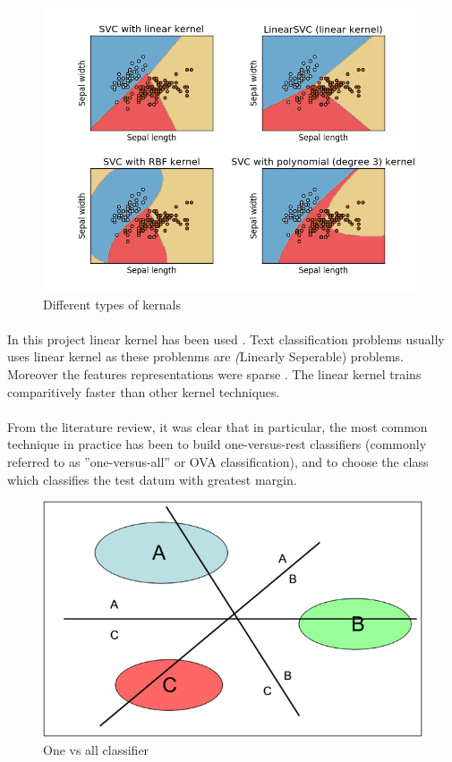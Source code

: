  \begin{figure}[!ht]
	\centering
	\includegraphics[width=0.9\linewidth]{svm_kernal.png}
	\caption{Different types of kernals}
	\label{fig:expression01}
\end{figure}

\paragraph{}
 In this project linear kernel has been used . Text classification problems usually uses linear kernel as these problenms are \textit(Linearly Seperable) problems. Moreover the features representations were sparse . The linear kernel trains comparitively faster than other kernel techniques.
 \paragraph{}
From the literature review, it was clear that in particular, the most  common technique in practice has been to build one-versus-rest classifiers  (commonly referred to as ”one-versus-all'' or OVA classification), and to choose  the class which classifies the test datum with greatest margin.
 \begin{figure}[!ht]
 	\centering
 	\includegraphics[width=0.9\linewidth]{svm_multi.png}
 	\caption{One vs all classifier}
 	\label{fig:expression01}
 \end{figure}
